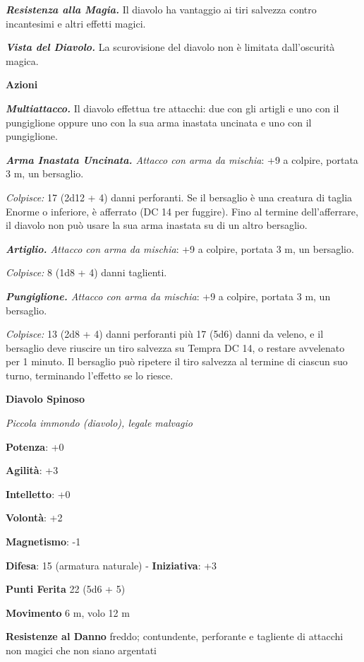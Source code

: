 \begin{multicols}{2}
\emph{\textbf{Resistenza alla Magia.}} Il diavolo ha vantaggio ai tiri
salvezza contro incantesimi e altri effetti magici.

\emph{\textbf{Vista del Diavolo.}} La scurovisione del diavolo non è
limitata dall'oscurità magica.

\textbf{Azioni}

\emph{\textbf{Multiattacco.}} Il diavolo effettua tre attacchi: due con
gli artigli e uno con il pungiglione oppure uno con la sua arma inastata
uncinata e uno con il pungiglione.

\emph{\textbf{Arma Inastata Uncinata.} Attacco con arma da mischia}: +9
a colpire, portata 3 m, un bersaglio.

\emph{Colpisce:} 17 (2d12 + 4) danni perforanti. Se il bersaglio è una
creatura di taglia Enorme o inferiore, è afferrato (DC 14 per fuggire).
Fino al termine dell'afferrare, il diavolo non può usare la sua arma
inastata su di un altro bersaglio.

\emph{\textbf{Artiglio.} Attacco con arma da mischia}: +9 a colpire,
portata 3 m, un bersaglio.

\emph{Colpisce:} 8 (1d8 + 4) danni taglienti.

\emph{\textbf{Pungiglione.} Attacco con arma da mischia}: +9 a colpire,
portata 3 m, un bersaglio.

\emph{Colpisce:} 13 (2d8 + 4) danni perforanti più 17 (5d6) danni da
veleno, e il bersaglio deve riuscire un tiro salvezza su Tempra DC
14, o restare avvelenato per 1 minuto. Il bersaglio può ripetere il tiro
salvezza al termine di ciascun suo turno, terminando l'effetto se lo
riesce.

\textbf{Diavolo Spinoso}

\emph{Piccola immondo (diavolo), legale malvagio}

\textbf{Potenza}: +0

\textbf{Agilità}: +3

\textbf{Intelletto}: +0

\textbf{Volontà}: +2

\textbf{Magnetismo}: -1

\textbf{Difesa}: 15 (armatura naturale) - \textbf{Iniziativa}: +3

\textbf{Punti Ferita} 22 (5d6 + 5)

\textbf{Movimento} 6 m, volo 12 m

\textbf{Resistenze al Danno} freddo; contundente, perforante e tagliente
di attacchi non magici che non siano argentati


\end{multicols}
